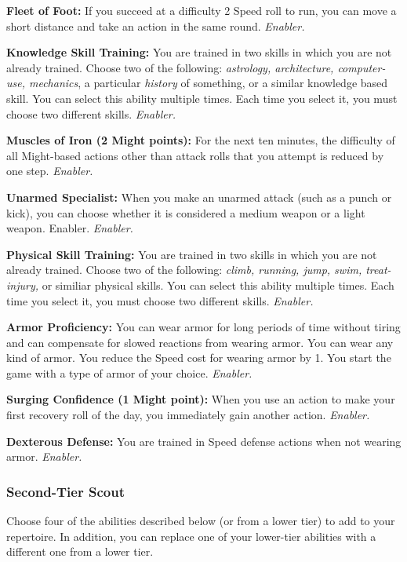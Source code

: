 \documentclass[a4paper,10pt,final,twocolumn,oneside]{book}
\newcommand{\itemAbility}[2]{\textcolor{25gray}{\textbullet\textbf{ #1:}}{ #2}\par}
\newcommand{\enabler}{\textit{ Enabler.}}
\begin{document}
\itemAbility{Fleet of Foot}{If you succeed at a difficulty 2 Speed roll to run, you can move a short distance and take an action in the same round.\enabler}

\itemAbility{Knowledge Skill Training}{You are trained in two skills in which you are not already trained. Choose two of the following: \textit{astrology, architecture, computer-use, mechanics}, a particular \textit{history} of something, or a similar knowledge based skill. You can select this ability multiple times. Each time you select it, you must choose two different skills.\enabler}

\itemAbility{Muscles of Iron (2 Might points)}{For the next ten minutes, the difficulty of all Might-based actions other than attack rolls that you attempt is reduced by one step.\enabler}

\itemAbility{Unarmed Specialist}{When you make an unarmed attack (such as a punch or kick), you can choose whether it is considered a medium weapon or a light weapon. Enabler.\enabler}

\itemAbility{Physical Skill Training}{You are trained in two skills in which you are not already trained. Choose two of the following: \textit{climb, running, jump, swim, treat-injury,} or similiar physical skills. You can select this ability multiple times. Each time you select it, you must choose two different skills.\enabler}

\itemAbility{Armor Proficiency}{You can wear armor for long periods of time without tiring and can compensate for slowed reactions from wearing armor. You can wear any kind of armor. You reduce the Speed cost for wearing armor by 1. You start the game with a type of armor of your choice.\enabler}

\itemAbility{Surging Confidence (1 Might point)}{When you use an action to make your first recovery roll of the day, you immediately gain another action.\enabler}

\itemAbility{Dexterous Defense}{You are trained in Speed defense actions when not wearing armor.\enabler}


\subsubsection*{Second-Tier Scout}
\label{subsub:scoutSecondTier}

Choose four of the abilities described
below (or from a lower tier) to add to your
repertoire. In addition, you can replace one
of your lower-tier abilities with a different
one from a lower tier.
\end{document}
